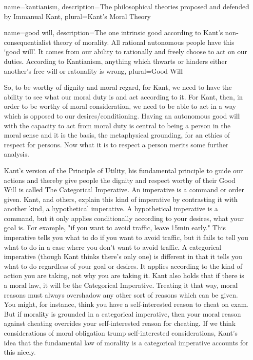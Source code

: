 {
  name=kantianism,
  description={The philosophical theories proposed and defended by Immanual Kant},
  plural=Kant's Moral Theory
}

{
  name=good will,
  description={The one intrinsic good according to Kant's non-consequentialist theory of morality. All rational autonomous people have this `good will'. It comes from our ability to rationally and freely choose to act on our duties. According to Kantianism, anything which thwarts or hinders either another's free will or ratonality is wrong},
  plural=Good Will
}


So, to be worthy of dignity and moral regard, for Kant, we need to have the ability to see what our moral duty is and act according to it. For Kant, then, in order to be worthy of moral consideration, we need to be able to act in a way which is opposed to our desires/conditioning. Having an autonomous good will with the capacity to act from moral duty is central to being a person in the moral sense and it is the basis, the metaphysical grounding, for an ethics of respect for persons. Now what it is to respect a person merits some further analysis.

Kant's version of the Principle of Utility, his fundamental principle to guide our actions and thereby give people the dignity and respect worthy of their Good Will is called The Categorical Imperative. An imperative is a command or order given. Kant, and others, explain this kind of imperative by contrasting it with another kind, a hypothetical imperative. A hypothetical imperative is a command, but it only applies conditionally according to your desires, what your goal is. For example, "if you want to avoid traffic, leave 15min early." This imperative tells you what to do if you want to avoid traffic, but it fails to tell you what to do in a case where you don't want to avoid traffic. A categorical imperative (though Kant thinks there's only one) is different in that it tells you what to do regardless of your goal or desires. It applies according to the kind of action you are taking, not why you are taking it. Kant also holds that if there is a moral law, it will be the Categorical Imperative. Treating it that way, moral reasons must always overshadow any other sort of reasons which can be given. You might, for instance, think you have a self-interested reason to cheat on exam. But if morality is grounded in a categorical imperative, then your moral reason against cheating overrides your self-interested reason for cheating. If we think considerations of moral obligation trump self-interested considerations, Kant’s idea that the fundamental law of morality is a categorical imperative accounts for this nicely.

